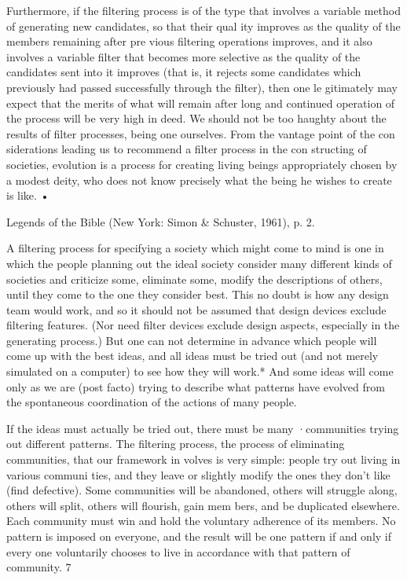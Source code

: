 \documentclass[11pt,openany]{book}
\begin{document}
Furthermore, if the filtering process is of the type that involves a variable method of generating new candidates, so that their qual ity improves as the quality of the members remaining after pre vious filtering operations improves, and it also involves a variable filter that becomes more selective as the quality of the candidates sent into it improves (that is, it rejects some candidates which previously had passed successfully through the filter), then one le gitimately may expect that the merits of what will remain after long and continued operation of the process will be very high in deed. We should not be too haughty about the results of filter processes, being one ourselves. From the vantage point of the con siderations leading us to recommend a filter process in the con structing of societies, evolution is a process for creating living beings appropriately chosen by a modest deity, who does not know precisely what the being he wishes to create is like. • 

Legends of the Bible (New York: Simon \& Schuster, 1961), p. 2. 

A filtering process for specifying a society which might come to mind is one in which the people planning out the ideal society consider many different kinds of societies and criticize some, eliminate some, modify the descriptions of others, until they come to the one they consider best. This no doubt is how any design team would work, and so it should not be assumed that design devices exclude filtering features. (Nor need filter devices exclude design aspects, especially in the generating process.) But one can not determine in advance which people will come up with the best ideas, and all ideas must be tried out (and not merely simulated on a computer) to see how they will work.* And some ideas will come only as we are (post facto) trying to describe what patterns have evolved from the spontaneous coordination of the actions of many people. 

If the ideas must actually be tried out, there must be many ·communities trying out different patterns. The filtering process, the process of eliminating communities, that our framework in volves is very simple: people try out living in various communi ties, and they leave or slightly modify the ones they don't like (find defective). Some communities will be abandoned, others will struggle along, others will split, others will flourish, gain mem bers, and be duplicated elsewhere. Each community must win and hold the voluntary adherence of its members. No pattern is imposed on everyone, and the result will be one pattern if and only if every one voluntarily chooses to live in accordance with that pattern of community. 7 
\end{document}

